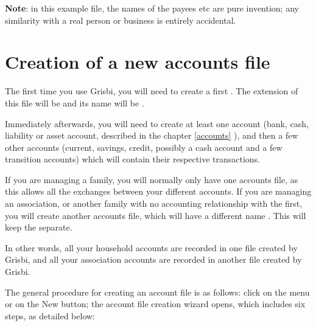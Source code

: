 \textbf{Note}: in this example file, the names of the payees etc are pure invention; any similarity with a real person or business is entirely accidental.

\section{Creation of a new accounts file\label{start-newfile}}


The first time you use Grisbi, you will need to create a first
. The \gls{extension} of this file will be  and its name will be .

Immediately afterwards, you will need to create at least one account (bank, cash, liability or asset account, described in the chapter \vref{accounts} ), and then a few other accounts (current, savings, credit, possibly a cash account and a few transition accounts) which will contain their respective transactions.

If you are managing a family, you will normally only have one accounts file, as this allows all the exchanges between your different accounts. If you are managing an association, or another family with no accounting relationship with the first, you will create another accounts file, which will have a different name . This will keep the  separate.

In other words, all your household accounts are recorded in one file created by Grisbi, and all your association accounts are recorded in another file created by Grisbi.



The general procedure for creating an account file is as follows: click on the menu  or on the New button; the account file creation wizard opens, which includes six steps, as detailed below:


